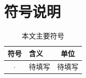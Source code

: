 \section{符号说明}


\begin{table}[H]
  \centering
  \caption{本文主要符号}
  \label{tab:symbols}
  \begin{tabular}{clc}
    \toprule
    符号 & 含义 & 单位 \\
    \midrule
    $\cdot$ & 待填写 & 待填写 \\
    \bottomrule
  \end{tabular}
\end{table}
